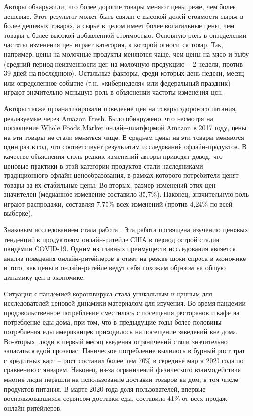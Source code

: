 Авторы обнаружили, что более дорогие товары меняют цены реже, чем более дешевые. Этот результат может быть связан с высокой долей стоимости сырья в более дешевых товарах, а сырье в целом имеет более волатильные цены, чем товары с более высокой добавленной стоимостью. Основную роль в определении частоты изменения цен играет категория, к которой относится товар. Так, например, цены на молочные продукты меняются чаще, чем цены на мясо и рыбу (средний период неизменности цен на молочную продукцию – 2 недели, против 39 дней на последнюю). Остальные факторы, среди которых день недели, месяц или определенное событие (т.н. «кибернеделя» или федеральный праздник) играют значительно меньшую роль в объяснении частоты изменения цен.

Авторы также проанализировали поведение цен на товары здорового питания, реализуемые через Amazon Fresh. Было обнаружено, что несмотря на поглощение Whole Foods Market онлайн-платформой Amazon в 2017 году, цены на эти товары не стали меняться чаще. В среднем цены на эти товары меняются один раз в год, что соответствует результатам исследований офлайн-продуктов. В качестве объяснения столь редких изменений авторы приводят довод, что ценовые практики в этой категории продуктов стали наследниками традиционного офлайн-ценообразования, в рамках которого потребители ценят товары за их стабильные цены. Во-вторых, размер изменений этих цен значителен (медианное изменение составило 35,7\%). Наконец, значительную роль играют распродажи, составляя 7,75\% всех изменений (против 4,24\% по всей выборке).

Знаковым исследованием стала работа \cite{hillen2021covid}. Эта работа посвящена изучению ценовых тенденций в продуктовом онлайн-ритейле США в период острой стадии пандемии COVID-19. Одним из главных преимуществ исследования является анализ поведения онлайн-ритейлеров в ответ на резкие шоки спроса в экономике и того, как цены в онлайн-ритейле ведут себя похожим образом на общую динамику цен в экономике.

Ситуация с пандемией коронавируса стала уникальным и ценным для исследователей ценовой динамики материалом для изучения. Во время пандемии продовольственное потребление сместилось с посещения ресторанов и кафе на потребление еды дома, при том, что в предыдущие годы более половины потребления еды американцев приходилось на посещение заведений вне дома. Во-вторых, люди в первый месяц введения ограничений стали значительно запасаться едой прозапас. Паническое потребление вылилось в бурный рост трат с кредитных карт – рост составил более чем 70\% в середине марта 2020 года по сравнению с январем. Наконец, из-за ограничений физического взаимодействия многие люди перешли на использование доставки товаров на дом, в том числе продуктов питания. В марте 2020 года доля пользователей, впервые воспользовавшихся сервисом доставки еды, составила 41\% от всех продаж онлайн-ритейлеров.

